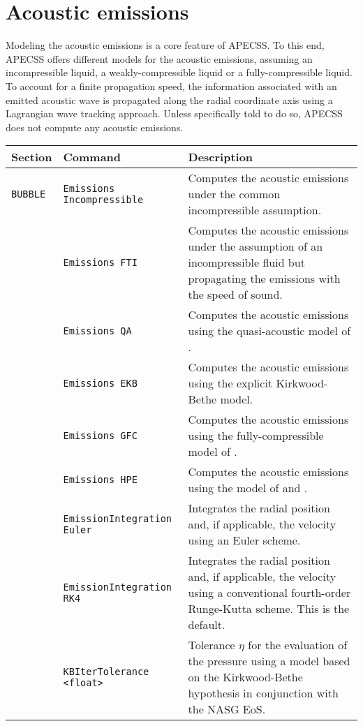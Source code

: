 \chapter{Acoustic emissions}

Modeling the acoustic emissions is a core feature of APECSS. To this end, APECSS offers different models for the acoustic emissions, assuming an incompressible liquid, a weakly-compressible liquid or a fully-compressible liquid. To account for a finite propagation speed, the information associated with an emitted acoustic wave is propagated along the radial coordinate axis using a Lagrangian wave tracking approach. Unless specifically told to do so, APECSS does not compute any acoustic emissions. 

\vspace{0.8em}

\noindent
\begin{tabular}{p{} p{} p{}}
    \textbf{Section} &\textbf{Command} & \textbf{Description} 
\vspace{1mm} \\ \hline
{\tt BUBBLE} & {\tt Emissions Incompressible} & Computes the acoustic emissions under the common incompressible assumption.\\ 
& {\tt Emissions FTI} & Computes the acoustic emissions under the assumption of an incompressible fluid but propagating the emissions with the speed of sound.\\ 
& {\tt Emissions QA} & Computes the acoustic emissions using the quasi-acoustic model of \citet{Gilmore1952}.\\ 
& {\tt Emissions EKB} & Computes the acoustic emissions using the explicit Kirkwood-Bethe model.\\ 
& {\tt Emissions GFC} & Computes the acoustic emissions using the fully-compressible model of \citet{Gilmore1952}.\\ 
& {\tt Emissions HPE} & Computes the acoustic emissions using the model of \citet{Hickling1963} and \citet{Ebeling1978}.\\ 
& {\tt EmissionIntegration Euler} & Integrates the radial position and, if applicable, the velocity using an Euler scheme.\\
& {\tt EmissionIntegration RK4} & Integrates the radial position and, if applicable, the velocity using a conventional fourth-order Runge-Kutta scheme. This is the default.\\
& {\tt KBIterTolerance <float>} & Tolerance $\eta$ for the evaluation of the pressure using a model based on the Kirkwood-Bethe hypothesis in conjunction with the NASG EoS.\\
 \hline
\end{tabular} \vspace{1em}

